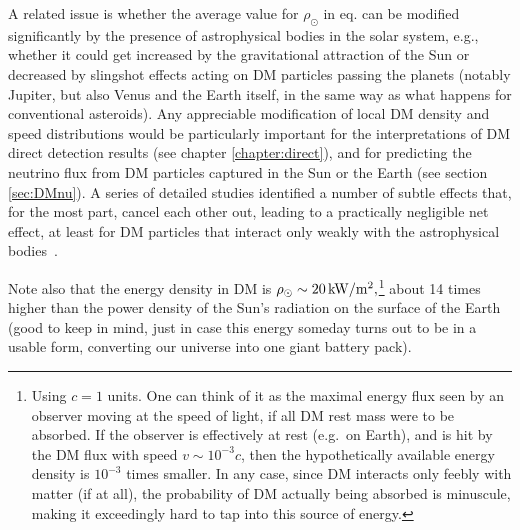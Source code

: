 A related issue is whether the average value for $\rho_\odot$ in eq. can be modified significantly by the presence of astrophysical bodies in the solar system, e.g., whether it could get increased by the gravitational attraction of the Sun or decreased by slingshot effects acting on DM particles passing the planets (notably Jupiter, but also Venus and the Earth itself, in the same way as what happens for conventional asteroids). Any appreciable modification of local DM density and speed distributions would be particularly important for the interpretations of DM direct detection results (see chapter \ref{chapter:direct}), and for predicting the neutrino flux from DM particles captured in the Sun or the Earth (see section \ref{sec:DMnu}). A series of detailed studies identified a number of subtle effects that, for the most part, cancel each other out, leading to a practically negligible net effect, at least for DM particles that interact only weakly with the astrophysical bodies~\cite{DMdensitysolarsystem}.

\smallskip

Note also that the energy density in DM is  $\rho_\odot  \sim 20\,{\rm kW}/{\rm m}^2,$\footnote{Using $c=1$ units. One can think of it as the maximal energy flux seen by an observer moving at the speed of light, if all DM rest mass were to be absorbed. 
If the observer is effectively at rest (e.g.~on Earth), and is hit by the DM flux with speed $v \sim 10^{-3} c$, then the hypothetically available energy density is $10^{-3}$ times smaller.
In any case, since DM interacts only feebly with matter (if at all), the probability of DM actually being absorbed is minuscule, making it exceedingly hard to tap into this source of energy.} about 14 times higher than the power density of the Sun's radiation on the surface of the Earth (good to keep in mind, just in case this energy someday turns out to be in a usable form, converting our universe into one giant battery pack).







